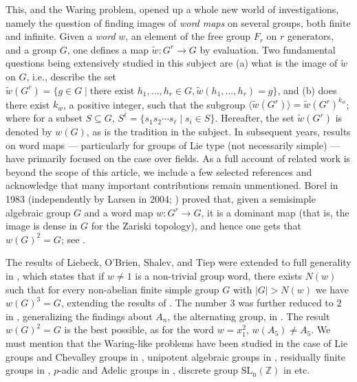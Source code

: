 \documentclass[11pt,twoside]{amsart}
\newcommand{\Z}{\mathbb{Z}}
\theoremstyle{definition} %
\begin{document}
This, and the Waring problem, opened up a whole new world of investigations, namely the question of finding images of \emph{word maps} on several groups, both finite and infinite. Given a \emph{word} $w$, an element of the free group $F_r$ on $r$ generators, and a group $G$, one defines a map $\widetilde{w} \colon G^r \rightarrow G$ by evaluation. Two fundamental questions being extensively studied in this subject are (a) what is the image of $\widetilde{w}$ on $G$, i.e., describe the set $\widetilde{w}(G^r) = \{g\in G\mid \text{there exist } h_1,\ldots, h_r \in G, \widetilde{w}(h_1, \ldots, h_r) = g\}$, and (b) does there exist $k_w$, a positive integer, such that the subgroup $\langle\widetilde{w}(G^r)\rangle = \widetilde{w}(G^r)^{k_w}$; where for a subset $S\subseteq G$, $S^\ell=\{s_1s_2\cdots s_\ell \mid s_i\in S\}$. Hereafter, the set $\widetilde{w}(G^r)$ is denoted by $w(G)$, as is the tradition in the subject. In subsequent years, results on word maps — particularly for groups of Lie type (not necessarily simple) — have primarily focused on the case over fields. As a full account of related work is beyond the scope of this article, we include a few selected references and acknowledge that many important contributions remain unmentioned. Borel in 1983 (independently by Larsen in 2004; \cite{Larsen2004}) proved that, given a semisimple algebraic group $G$ and a word map $w\colon G^r \rightarrow G$, it is a dominant map (that is, the image is dense in $G$ for the Zariski topology), and hence one gets that $w(G)^2 = G$; see \cite{Borel1983}.

The results of Liebeck, O'Brien, Shalev, and Tiep \cite{LiebeckBrienShalev10} were extended to full generality in \cite{Shalev2009}, which states that if $w\neq 1$ is a non-trivial group word, there exists $N(w)$ such that for every non-abelian finite simple group $G$ with $|G|> N(w)$ we have $w(G)^3 = G$, extending the results of \cite{LiebeckShalev2001}. The number $3$ was further reduced to $2$ in \cite{LarsenShalevTiep2011Annals}, generalizing the findings about $A_n$, the alternating group, in \cite{LarsenShalev2009JAMS}. The result $w(G)^2 = G$ is the best possible, as for the word $w = x_1^2$, $w(A_5)\neq A_5$. We must mention that the Waring-like problems have been studied in the case of Lie groups and Chevalley groups in \cite{HuiLarsenShalev15}, unipotent algebraic groups in \cite{Larsen19unipotent}, residually finite groups in \cite{LarsenShalev18residual}, $p$-adic and Adelic groups in \cite{AvniShalev13}, discrete group $\mathrm{SL_n(\Z)}$ in \cite{AvniMeiri2019} etc.
\end{document}

